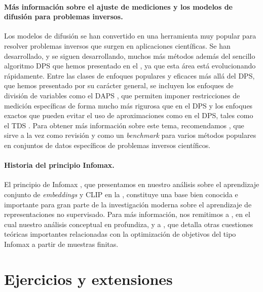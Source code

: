 \documentclass[../../book-main_es.tex]{subfiles}
\begin{document}
\paragraph{Más información sobre el ajuste de mediciones y los modelos de difusión para problemas inversos.}

Los modelos de difusión se han convertido en una herramienta muy popular para resolver problemas inversos
que surgen en aplicaciones científicas. Se han desarrollado, y se siguen desarrollando, muchos más métodos además del sencillo
algoritmo DPS que hemos presentado en el
,
ya que esta área está evolucionando rápidamente.
Entre las clases de enfoques populares y eficaces más allá del DPS, que hemos presentado
por su carácter general, se incluyen los enfoques de división de variables como el DAPS
\cite{Zhang2024-ha},
que permiten imponer restricciones de medición específicas de forma mucho más
rigurosa que en el DPS y los enfoques exactos que pueden evitar el uso de
aproximaciones como en el DPS, tales como el TDS \cite{wu2023practical}.
Para obtener más información sobre este tema, recomendamos \cite{zheng2025inversebench}, que
sirve a la vez como revisión y como un \textit{benchmark} para varios métodos populares
en conjuntos de datos específicos de problemas inversos científicos.

\paragraph{Historia del principio Infomax.}
El principio de Infomax \cite{infomax}, que presentamos en nuestro análisis sobre
el aprendizaje conjunto de \textit{embeddings} y CLIP en la , constituye una base bien conocida e
importante para gran parte de la investigación moderna sobre el aprendizaje de representaciones
no supervisado. Para más información, nos remitimos a
\cite{Van_den_Oord2018-qf}, en el cual nuestro análisis conceptual en  profundiza,
y a \cite{Oko2025-wk}, que detalla otras cuestiones teóricas importantes relacionadas con
la optimización de objetivos del tipo Infomax a partir de muestras finitas.

\section{Ejercicios y extensiones}
\end{document}
